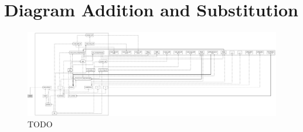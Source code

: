 \section{Diagram Addition and Substitution}
\begin{figure}[H]
    \includegraphics[width=\textwidth]{images/diagram_list_add_sub.png}
     \caption{TODO }
     \label{fig:diagram_test_add_sub}
\end{figure}
